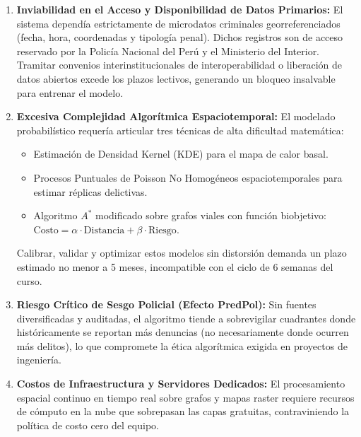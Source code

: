 \documentclass[11pt,a4paper]{article}
\begin{document}
\begin{enumerate}[leftmargin=*]
    \item \textbf{Inviabilidad en el Acceso y Disponibilidad de Datos Primarios:}
    El sistema dependía estrictamente de microdatos criminales georreferenciados (fecha, hora, coordenadas y tipología penal). Dichos registros son de acceso reservado por la Policía Nacional del Perú y el Ministerio del Interior. Tramitar convenios interinstitucionales de interoperabilidad o liberación de datos abiertos excede los plazos lectivos, generando un bloqueo insalvable para entrenar el modelo.

    \item \textbf{Excesiva Complejidad Algorítmica Espaciotemporal:}
    El modelado probabilístico requería articular tres técnicas de alta dificultad matemática:
    \begin{itemize}
        \item Estimación de Densidad Kernel (KDE) para el mapa de calor basal.
        \item Procesos Puntuales de Poisson No Homogéneos espaciotemporales para estimar réplicas delictivas.
        \item Algoritmo $A^*$ modificado sobre grafos viales con función biobjetivo: $\text{Costo} = \alpha \cdot \text{Distancia} + \beta \cdot \text{Riesgo}$.
    \end{itemize}
    Calibrar, validar y optimizar estos modelos sin distorsión demanda un plazo estimado no menor a 5 meses, incompatible con el ciclo de 6 semanas del curso.

    \item \textbf{Riesgo Crítico de Sesgo Policial (Efecto PredPol):}
    Sin fuentes diversificadas y auditadas, el algoritmo tiende a sobrevigilar cuadrantes donde históricamente se reportan más denuncias (no necesariamente donde ocurren más delitos), lo que compromete la ética algorítmica exigida en proyectos de ingeniería.

    \item \textbf{Costos de Infraestructura y Servidores Dedicados:}
    El procesamiento espacial continuo en tiempo real sobre grafos y mapas raster requiere recursos de cómputo en la nube que sobrepasan las capas gratuitas, contraviniendo la política de costo cero del equipo.
\end{enumerate}
\end{document}
